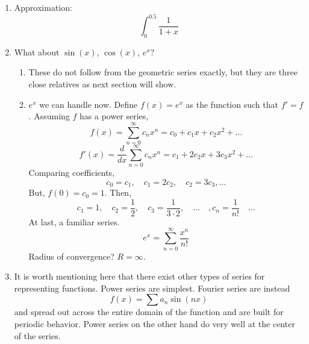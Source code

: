 \documentclass{article}
\begin{document}
\begin{enumerate}
\begin{enumerate}
\item Approximation: 
$$\int_0^{0.5} \frac{1}{1+x}$$

\item What about $\sin (x)$, $\cos (x)$, $e^x$? 
\begin{enumerate}
\item These do not follow from the geometric series exactly, but they are three close relatives as next section will show. 
\item $e^x$ we can handle now. Define $f(x)=e^x$ as the function such that $f'=f$. Assuming $f$ has a power series,
\[
f(x) = \sum_{n=0}^\infty c_n x^n = c_0 + c_1 x + c_2 x^2 + \dots 
\]
\[
f'(x) = \frac{d}{dx} \sum_{n=0}^\infty c_n x^n = c_1 + 2c_2 x + 3c_3 x^2 + \dots
\]
Comparing coefficients,
\[
c_0 = c_1, \quad c_1 = 2 c_2, \quad c_2 = 3 c_3, \dots
\]
But, $f(0)=c_0=1$. Then,
\[
c_1 = 1, \quad c_2 = \frac{1}{2}, \quad c_3 = \frac{1}{3\cdot 2}, \quad \dots \quad , c_n = \frac{1}{n!} \quad \dots
\]
At last, a familiar series.
\[
e^x = \sum_{n=0}^\infty \frac{x^n}{n!}
\]
Radius of convergence? $R=\infty$.

\end{enumerate}

\item It is worth mentioning here that there exist other types of series for representing functions. Power series are simplest. Fourier series are instead 
\[
f(x) = \sum a_n \sin(nx)
\]
and spread out across the entire domain of the function and are built for periodic behavior. Power series on the other hand do very well at the center of the series.
\end{enumerate}

\end{enumerate}


\end{document}
